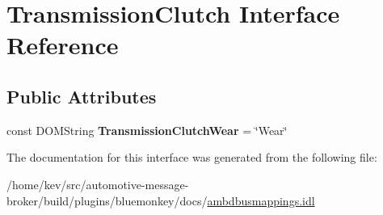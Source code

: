 \hypertarget{interfaceTransmissionClutch}{\section{Transmission\+Clutch Interface Reference}
\label{interfaceTransmissionClutch}
}
\subsection*{Public Attributes}
\begin{DoxyCompactItemize}
\item 
\hypertarget{interfaceTransmissionClutch_ab8645ae72ab9dd0d586c91206e16202f}{const D\+O\+M\+String {\bfseries Transmission\+Clutch\+Wear} = \char`\"{}Wear\char`\"{}}\label{interfaceTransmissionClutch_ab8645ae72ab9dd0d586c91206e16202f}

\end{DoxyCompactItemize}


The documentation for this interface was generated from the following file\+:\begin{DoxyCompactItemize}
\item 
/home/kev/src/automotive-\/message-\/broker/build/plugins/bluemonkey/docs/\hyperlink{ambdbusmappings_8idl}{ambdbusmappings.\+idl}\end{DoxyCompactItemize}
